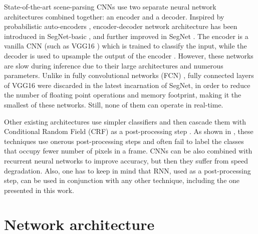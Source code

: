 \documentclass{article}
\begin{document}
State-of-the-art scene-parsing CNNs use two separate neural network architectures combined together: an encoder and a decoder.
Inspired by probabilistic auto-encoders \cite{ranzato07,ngiam11}, encoder-decoder network architecture has been introduced in SegNet-basic \cite{badrinarayanan15basic}, and further improved in SegNet \cite{badrinarayanan15}.
The encoder is a vanilla CNN (such as VGG16 \cite{simonyan14}) which is trained to classify the input, while the decoder is used to upsample the output of the encoder \cite{long15,noh2015learning,zheng2015conditional,eigen2015predicting,hong2015decoupled}.
However, these networks are slow during inference due to their large architectures and numerous parameters.
Unlike in fully convolutional networks (FCN) \cite{long15}, fully connected layers of VGG16 were discarded in the latest incarnation of SegNet, in order to reduce the number of floating point operations and memory footprint, making it the smallest of these networks.
Still, none of them can operate in real-time.

Other existing architectures use simpler classifiers and then cascade them with Conditional Random Field (CRF) as a post-processing step \cite{liang14,sturgess09}.
As shown in \cite{badrinarayanan15}, these techniques use onerous post-processing steps and often fail to label the classes that occupy fewer number of pixels in a frame.
CNNs can be also combined with recurrent neural networks \cite{zheng2015conditional} to improve accuracy, but then they suffer from speed degradation.
Also, one has to keep in mind that RNN, used as a post-processing step, can be used in conjunction with any other technique, including the one presented in this work.



\section{Network architecture} \label{architecture}
\end{document}
